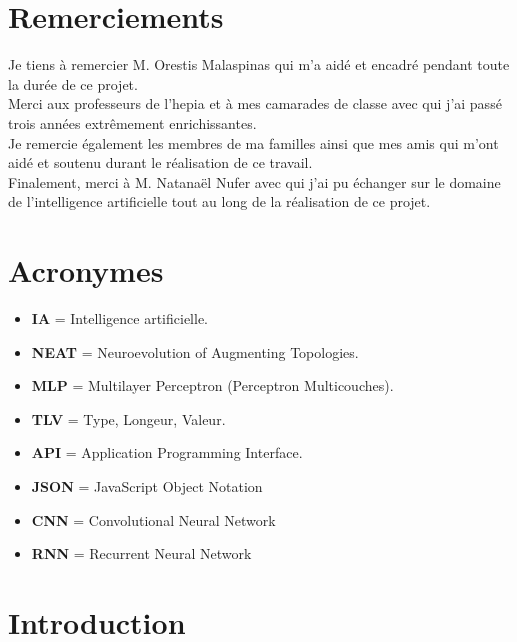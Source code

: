 \documentclass{article}
\begin{document}




\section*{Remerciements}

Je tiens à remercier M. Orestis Malaspinas qui m'a aidé et encadré pendant toute la durée de ce projet.\\

Merci aux professeurs de l'hepia et à mes camarades de classe avec qui j'ai passé trois années extrêmement enrichissantes.\\

Je remercie également les membres de ma familles ainsi que mes amis qui m'ont aidé et soutenu durant le réalisation de ce travail.\\

Finalement, merci à M. Natanaël Nufer avec qui j'ai pu échanger sur le domaine de l'intelligence artificielle tout au long de la réalisation de ce projet.
\newpage
\section*{Acronymes}
\begin{itemize}
	\item \textbf{IA} = Intelligence artificielle.
	\item \textbf{NEAT} = Neuroevolution of Augmenting Topologies.
	\item \textbf{MLP} = Multilayer Perceptron (Perceptron Multicouches).
	\item \textbf{TLV} = Type, Longeur, Valeur.
	\item \textbf{API} = Application Programming Interface.
	\item \textbf{JSON} = JavaScript Object Notation
	\item \textbf{CNN} = Convolutional Neural Network
	\item \textbf{RNN} = Recurrent Neural Network
\end{itemize}

\newpage
\tableofcontents

\newpage

\listoffigures

\newpage

\section{Introduction}
\end{document}
